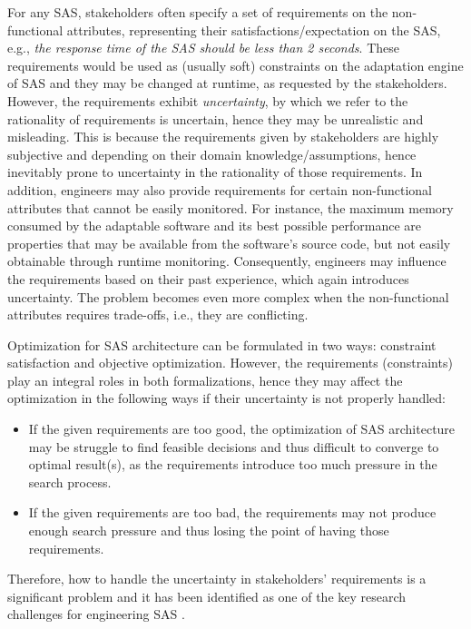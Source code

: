 \documentclass[DIV15,a4paper]{scrartcl}
\begin{document}
For any SAS, stakeholders often specify a set of requirements on the non-functional attributes, representing their satisfactions/expectation on the SAS, e.g., \emph{the response time of the SAS should be less than 2 seconds}. These requirements would be used as (usually soft) constraints on the adaptation engine of SAS and they may be changed at runtime, as requested by the stakeholders. However, the requirements exhibit \emph{uncertainty}, by which we refer to the rationality of requirements is uncertain, hence they may be unrealistic and misleading. This is because the requirements given by stakeholders are highly subjective and depending on their domain knowledge/assumptions, hence inevitably prone to uncertainty in the rationality of those requirements. In addition, engineers may also provide requirements for certain non-functional attributes that cannot be easily monitored. For instance, the maximum memory consumed by the adaptable software and its best possible performance are properties that may be available from the software's source code, but not easily obtainable through runtime monitoring. Consequently, engineers may influence the requirements based on their past experience, which again introduces uncertainty. The problem becomes even more complex when the non-functional attributes requires trade-offs, i.e., they are conflicting. 

Optimization for SAS architecture can be formulated in two ways: constraint satisfaction and objective optimization. However, the requirements (constraints) play an integral roles in both formalizations, hence they may affect the optimization in the following ways if their uncertainty is not properly handled:

\begin{itemize}

\item If the given requirements are too good, the optimization of SAS architecture may be struggle to find feasible decisions and thus difficult to converge to optimal result(s), as the requirements introduce too much pressure in the search process.

\item If the given requirements are too bad, the requirements may not produce enough search pressure and thus losing the point of having those requirements.

\end{itemize}

Therefore, how to handle the uncertainty in stakeholders' requirements is a significant problem and it has been identified as one of the key research challenges for engineering SAS \cite{Cheng2009} \cite{Esfahani:2011}.
\end{document}
